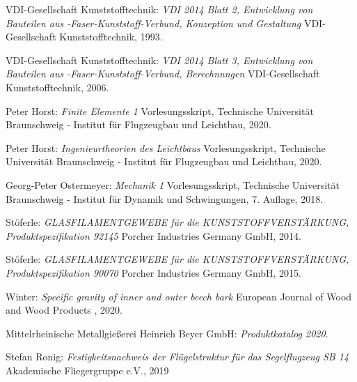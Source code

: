 \begin{thebibliography}{99}
	VDI-Gesellschaft Kunststofftechnik:
	\textit{VDI 2014 Blatt 2, Entwicklung von Bauteilen aus -Faser-Kunststoff-Verbund, Konzeption und Gestaltung}
	VDI-Gesellschaft Kunststofftechnik, 1993.
	
	VDI-Gesellschaft Kunststofftechnik:
	\textit{VDI 2014 Blatt 3, Entwicklung von Bauteilen aus -Faser-Kunststoff-Verbund, Berechnungen}
	VDI-Gesellschaft Kunststofftechnik, 2006.
	
	Peter Horst:
	\textit{Finite Elemente 1}
	Vorlesungsskript, Technische Universität Braunschweig - Institut für Flugzeugbau und Leichtbau, 2020.
	
	Peter Horst:
	\textit{Ingenieurtheorien des Leichtbaus}
	Vorlesungsskript, Technische Universität Braunschweig - Institut für Flugzeugbau und Leichtbau, 2020.
	
	Georg-Peter Ostermeyer:
	\textit{Mechanik 1}
	Vorlesungsskript, Technische Universität Braunschweig - Institut für Dynamik und Schwingungen, 7. Auflage, 2018.
	
	Stöferle:
	\textit{GLASFILAMENTGEWEBE für die KUNSTSTOFFVERSTÄRKUNG, Produktspezifikation 92145}
	Porcher Industries Germany GmbH, 2014.
	
	Stöferle:
	\textit{GLASFILAMENTGEWEBE für die KUNSTSTOFFVERSTÄRKUNG, Produktspezifikation 90070}
	Porcher Industries Germany GmbH, 2015.
	
	Winter:
	\textit{Specific gravity of inner and outer beech bark}
	European Journal of Wood and Wood Products , 2020.
	
	Mittelrheinische Metallgießerei Heinrich Beyer GmbH:
	\textit{Produktkatalog 2020}.
	
	Stefan Ronig:
	\textit{Festigkeitsnachweis der Flügelstruktur für das Segelflugzeug SB 14}
	Akademische Fliegergruppe e.V., 2019
	
	
	
\end{thebibliography}
\endgroup